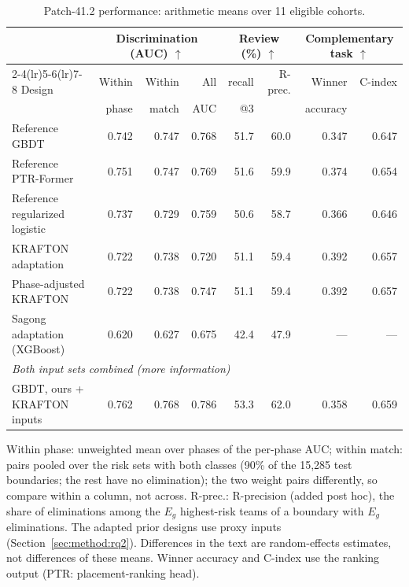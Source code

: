\begin{table}[t]
\centering\footnotesize
\caption{Patch-41.2 performance: arithmetic means over 11 eligible cohorts.}
\label{tab:main}
\setlength{\tabcolsep}{2.5pt}
\begin{tabular*}{\textwidth}{@{\extracolsep{\fill}}lrrrrrrr@{}}
\toprule
 & \multicolumn{3}{c}{Discrimination (AUC) $\uparrow$} & \multicolumn{2}{c}{Review (\%) $\uparrow$} & \multicolumn{2}{c}{Complementary task $\uparrow$} \\
\cmidrule(lr){2-4}\cmidrule(lr){5-6}\cmidrule(lr){7-8}
Design & Within & Within & All & recall & R-prec. & Winner & C-index \\
 & phase & match & AUC & @3 &  & accuracy &  \\
\midrule
Reference GBDT & 0.742 & 0.747 & 0.768 & 51.7 & 60.0 & 0.347 & 0.647 \\
Reference PTR-Former & 0.751 & 0.747 & 0.769 & 51.6 & 59.9 & 0.374 & 0.654 \\
Reference regularized logistic & 0.737 & 0.729 & 0.759 & 50.6 & 58.7 & 0.366 & 0.646 \\
KRAFTON adaptation & 0.722 & 0.738 & 0.720 & 51.1 & 59.4 & 0.392 & 0.657 \\
Phase-adjusted KRAFTON & 0.722 & 0.738 & 0.747 & 51.1 & 59.4 & 0.392 & 0.657 \\
Sagong adaptation (XGBoost) & 0.620 & 0.627 & 0.675 & 42.4 & 47.9 & --- & --- \\
\midrule
\multicolumn{8}{l}{\emph{Both input sets combined (more information)}} \\
GBDT, ours + KRAFTON inputs & 0.762 & 0.768 & 0.786 & 53.3 & 62.0 & 0.358 & 0.659 \\
\bottomrule
\end{tabular*}
\smallskip
\parbox{\textwidth}{\scriptsize Within phase: unweighted mean over phases of the per-phase AUC; within match: pairs pooled over the risk sets with both classes (90\% of the 15,285 test boundaries; the rest have no elimination); the two weight pairs differently, so compare within a column, not across. R-prec.: R-precision (added post hoc), the share of eliminations among the $E_g$ highest-risk teams of a boundary with $E_g$ eliminations. The adapted prior designs use proxy inputs (Section~\ref{sec:method:rq2}). Differences in the text are random-effects estimates, not differences of these means. Winner accuracy and C-index use the ranking output (PTR: placement-ranking head).}
\end{table}
